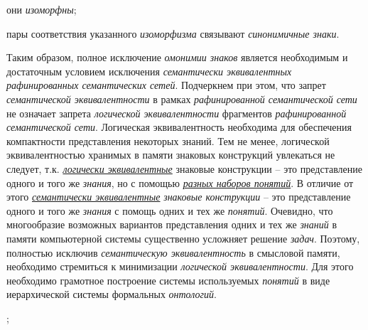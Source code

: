 \begin{SCn}
{{\begin{scnitemize}
	\item они \textit{изоморфны};
	\item пары соответствия указанного \textit{изоморфизма} связывают \textit{синонимичные знаки}. 
\end{scnitemize}
Таким образом, полное исключение \textit{омонимии знаков} является необходимым и достаточным условием исключения \textit{семантически эквивалентных рафинированных семантических сетей}. Подчеркнем при этом, что запрет \textit{семантической эквивалентности} в рамках \textit{рафинированной семантической сети} не означает запрета \textit{логической эквивалентности} фрагментов \textit{рафинированной семантической сети}. Логическая эквивалентность необходима для обеспечения компактности представления некоторых знаний. Тем не менее, логической эквивалентностью хранимых в памяти знаковых конструкций увлекаться не следует, т.к. \uline{\textit{логически эквивалентные}} знаковые конструкции -- это представление одного и того же \textit{знания}, но с помощью \uline{\textit{разных наборов понятий}}. В отличие от этого \uline{\textit{семантически эквивалентные}} \textit{знаковые конструкции} -- это представление одного и того же \textit{знания} с помощь одних и тех же \textit{понятий}. Очевидно, что многообразие возможных вариантов представления одних и тех же \textit{знаний} в памяти компьютерной системы существенно усложняет решение \textit{задач}. Поэтому, полностью исключив \textit{семантическую эквивалентность} в смысловой памяти, необходимо стремиться к минимизации \textit{логической эквивалентности}. Для этого необходимо грамотное построение системы используемых \textit{понятий} в виде иерархической системы формальных \textit{онтологий}.}
;
}
\end{SCn}
